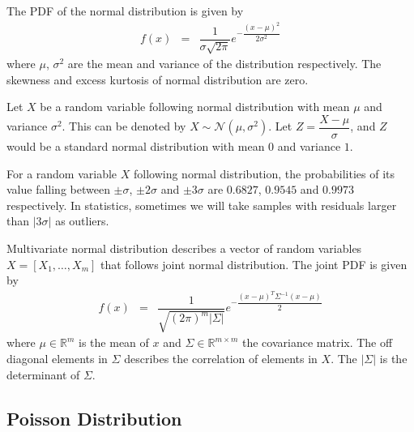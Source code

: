 The PDF of the normal distribution is given by
\begin{eqnarray}
  f(x) &=& \dfrac{1}{\sigma\sqrt{2\pi}}e^{-\dfrac{(x-\mu)^2}{2\sigma^2}} \nonumber
\end{eqnarray}
where $\mu$, $\sigma^2$ are the mean and variance of the distribution respectively. The skewness and excess kurtosis of normal distribution are zero.

Let $X$ be a random variable following normal distribution with mean $\mu$ and variance $\sigma^2$. This can be denoted by $X\sim\mathcal{N}(\mu, \sigma^2)$. Let $Z=\dfrac{X-\mu}{\sigma}$, and $Z$ would be a standard normal distribution with mean $0$ and variance $1$.

For a random variable $X$ following normal distribution, the probabilities of its value falling between $\pm \sigma$, $\pm 2\sigma$ and $\pm 3\sigma$ are $0.6827$, $0.9545$ and $0.9973$ respectively. In statistics, sometimes we will take samples with residuals larger than $|3\sigma|$ as outliers.

Multivariate normal distribution describes a vector of random variables $X = \left[X_1, \ldots, X_m\right]$ that follows joint normal distribution. The joint PDF is given by
\begin{eqnarray}
  f(x) &=& \dfrac{1}{\sqrt{(2\pi)^m|\Sigma|}}e^{-\dfrac{(x-\mu)^T\Sigma^{-1}(x-\mu)}{2}} \nonumber
\end{eqnarray}
where $\mu \in \mathbb{R}^m$ is the mean of $x$ and $\Sigma \in \mathbb{R}^{m\times m}$ the covariance matrix. The off diagonal elements in $\Sigma$ describes the correlation of elements in $X$. The $|\Sigma|$ is the determinant of $\Sigma$.

\subsection{Poisson Distribution}

